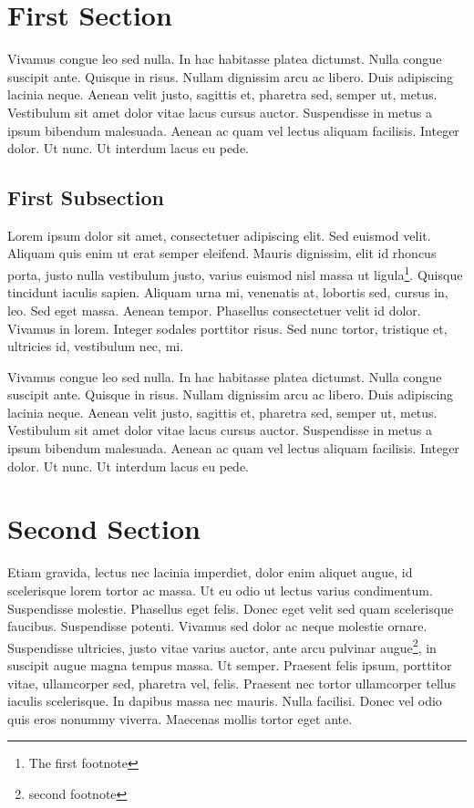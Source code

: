 \documentclass{article}
\begin{document}
\section{First Section}

Vivamus congue leo sed nulla. In hac habitasse platea dictumst. Nulla 
congue suscipit ante. Quisque in risus. Nullam dignissim arcu ac libero. 
Duis adipiscing lacinia neque. Aenean velit justo, sagittis et, pharetra 
sed\footnotemark, semper ut, metus. Vestibulum sit amet dolor vitae lacus cursus auctor. 
Suspendisse in metus a ipsum bibendum malesuada. Aenean ac quam vel lectus 
aliquam facilisis. Integer dolor. Ut nunc. Ut interdum lacus eu pede.


\subsection{First Subsection}

Lorem ipsum dolor sit amet, consectetuer adipiscing elit. Sed euismod 
velit. Aliquam quis enim ut erat semper eleifend. Mauris dignissim, elit 
id rhoncus porta, justo nulla vestibulum justo, varius euismod nisl massa 
ut ligula\footnote{The first footnote}. Quisque tincidunt iaculis sapien. Aliquam urna mi, venenatis at, 
lobortis sed, cursus in, leo. Sed eget massa. Aenean tempor. Phasellus 
consectetuer velit id dolor. Vivamus in lorem. Integer sodales porttitor 
risus. Sed nunc tortor, tristique et, ultricies id, vestibulum nec, mi.

Vivamus congue leo sed nulla. In hac habitasse platea dictumst. Nulla 
congue suscipit ante. Quisque in risus. Nullam dignissim arcu ac libero. 
Duis adipiscing lacinia neque. Aenean velit justo, sagittis et, pharetra 
sed, semper ut, metus. Vestibulum sit amet dolor vitae lacus cursus auctor. 
Suspendisse in metus a ipsum bibendum malesuada. Aenean ac quam vel lectus 
aliquam facilisis. Integer dolor. Ut nunc. Ut interdum lacus eu pede.

\section{Second Section}

Etiam gravida, lectus nec lacinia imperdiet, dolor enim aliquet augue, 
id scelerisque lorem tortor ac massa. Ut eu odio ut lectus varius condimentum. 
Suspendisse molestie. Phasellus eget felis. Donec eget velit sed quam 
scelerisque faucibus. Suspendisse potenti. Vivamus sed dolor ac neque 
molestie ornare. Suspendisse ultricies, justo vitae varius auctor, ante 
arcu pulvinar augue\footnote{second footnote}, in suscipit augue magna tempus massa. Ut semper. 
Praesent felis ipsum, porttitor vitae, ullamcorper sed, pharetra vel, 
felis. Praesent nec tortor ullamcorper tellus iaculis scelerisque. In 
dapibus massa nec mauris. Nulla facilisi. Donec vel odio quis eros nonummy 
viverra. Maecenas mollis tortor eget ante.
\end{document}

